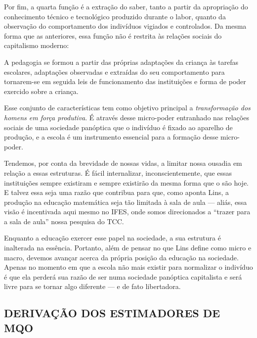 \documentclass[
  12pt,
  letterpaper,
  DIV=11,
  numbers=noendperiod]{scrartcl}
\newenvironment{citacao}
    {\begin{quoting}[rightmargin=0cm,leftmargin=4cm]
    \begin{singlespace}
    \footnotesize
    }
    {\end{singlespace}
    \end{quoting}
}
\begin{document}
Por fim, a quarta função é a extração do saber, tanto a partir da
apropriação do conhecimento técnico e tecnológico produzido durante o
labor, quanto da observação do comportamento dos indivíduos vigiados e
controlados. Da mesma forma que as anteriores, essa função não é
restrita às relações sociais do capitalismo moderno:

\begin{citacao}
A pedagogia se formou a partir das próprias adaptações da criança às tarefas escolares, adaptações observadas e extraídas do seu comportamento para tornarem-se em seguida leis de funcionamento das instituições e forma de poder exercido sobre a criança. \citep[p.~122]{foucault}
\end{citacao}

Esse conjunto de características tem como objetivo principal a
\emph{transformação dos homens em força produtiva}. É através desse
micro-poder entranhado nas relações sociais de uma sociedade panóptica
que o indivíduo é fixado ao aparelho de produção, e a escola é um
instrumento essencial para a formação desse micro-poder.

Tendemos, por conta da brevidade de nossas vidas, a limitar nossa
ousadia em relação a essas estruturas. É fácil internalizar,
inconscientemente, que essas instituições sempre existiram e sempre
existirão da mesma forma que o são hoje. E talvez essa seja uma razão
que contribua para que, como aponta Lins, a produção na educação
matemática seja tão limitada à sala de aula --- aliás, essa visão é
incentivada aqui mesmo no IFES, onde somos direcionados a ``trazer para
a sala de aula'' nossa pesquisa do TCC.

Enquanto a educação exercer esse papel na sociedade, a sua estrutura é
inalterada na essência. Portanto, além de pensar no que Lins define como
micro e macro, devemos avançar acerca da própria posição da educação na
sociedade. Apenas no momento em que a escola não mais existir para
normalizar o indivíduo é que ela perderá sua razão de ser numa sociedade
panóptica capitalista e será livre para se tornar algo diferente --- e
de fato libertadora.

\newpage

\hypertarget{derivauxe7uxe3o-dos-estimadores-de-mqo}{%
\subsection*{DERIVAÇÃO DOS ESTIMADORES DE
MQO}\label{derivauxe7uxe3o-dos-estimadores-de-mqo}}
\end{document}
